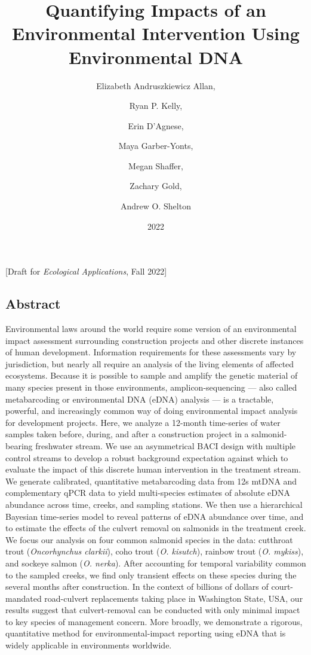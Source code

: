 \documentclass[
]{article}
\title{Quantifying Impacts of an Environmental Intervention Using
Environmental DNA}
\author{Elizabeth Andruszkiewicz Allan, \and Ryan P. Kelly, \and Erin
D'Agnese, \and Maya Garber-Yonts, \and Megan Shaffer, \and Zachary
Gold, \and Andrew O. Shelton}
\date{2022}
\begin{document}
\maketitle

{[}Draft for \emph{Ecological Applications}, Fall 2022{]}

\hypertarget{abstract}{%
\subsection{Abstract}\label{abstract}}

Environmental laws around the world require some version of an
environmental impact assessment surrounding construction projects and
other discrete instances of human development. Information requirements
for these assessments vary by jurisdiction, but nearly all require an
analysis of the living elements of affected ecosystems. Because it is
possible to sample and amplify the genetic material of many species
present in those environments, amplicon-sequencing --- also called
metabarcoding or environmental DNA (eDNA) analysis --- is a tractable,
powerful, and increasingly common way of doing environmental impact
analysis for development projects. Here, we analyze a 12-month
time-series of water samples taken before, during, and after a
construction project in a salmonid-bearing freshwater stream. We use an
asymmetrical BACI design with multiple control streams to develop a
robust background expectation against which to evaluate the impact of
this discrete human intervention in the treatment stream. We generate
calibrated, quantitative metabarcoding data from 12s mtDNA and
complementary qPCR data to yield multi-species estimates of absolute
eDNA abundance across time, creeks, and sampling stations. We then use a
hierarchical Bayesian time-series model to reveal patterns of eDNA
abundance over time, and to estimate the effects of the culvert removal
on salmonids in the treatment creek. We focus our analysis on four
common salmonid species in the data: cutthroat trout (\emph{Oncorhynchus
clarkii}), coho trout (\emph{O. kisutch}), rainbow trout (\emph{O.
mykiss}), and sockeye salmon (\emph{O. nerka}). After accounting for
temporal variability common to the sampled creeks, we find only
transient effects on these species during the several months after
construction. In the context of billions of dollars of court-mandated
road-culvert replacements taking place in Washington State, USA, our
results suggest that culvert-removal can be conducted with only minimal
impact to key species of management concern. More broadly, we
demonstrate a rigorous, quantitative method for environmental-impact
reporting using eDNA that is widely applicable in environments
worldwide.
\end{document}
